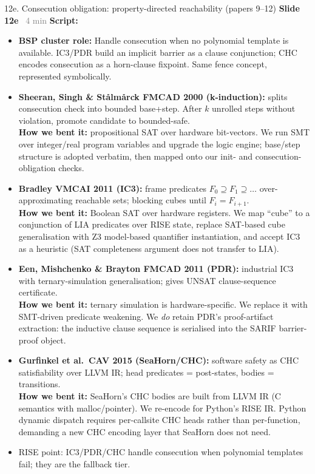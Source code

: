 \documentclass[aspectratio=169]{beamer}
\newcommand{\syncline}[2]{\textbf{#1} \hfill \textcolor{gray}{#2}}
\begin{document}
\begin{frame}[shrink=68]{12e. Consecution obligation: property-directed reachability (papers 9--12)}
\syncline{Slide 12e}{~4 min}
\textbf{Script:}
\begin{itemize}
  \item \textbf{BSP cluster role:} Handle consecution when no polynomial template is available. IC3/PDR build an implicit barrier as a clause conjunction; CHC encodes consecution as a horn-clause fixpoint. Same fence concept, represented symbolically.
  \item \textbf{Sheeran, Singh \& St\aa lm\aa rck FMCAD 2000 (k-induction):} splits consecution check into bounded base+step. After \(k\) unrolled steps without violation, promote candidate to bounded-safe.\\
    \textbf{How we bent it:} propositional SAT over hardware bit-vectors. We run SMT over integer/real program variables and upgrade the logic engine; base/step structure is adopted verbatim, then mapped onto our init- and consecution-obligation checks.
  \item \textbf{Bradley VMCAI 2011 (IC3):} frame predicates \(F_0\supseteq F_1\supseteq\ldots\) over-approximating reachable sets; blocking cubes until \(F_i=F_{i+1}\).\\
    \textbf{How we bent it:} Boolean SAT over hardware registers. We map ``cube'' to a conjunction of LIA predicates over RISE state, replace SAT-based cube generalisation with Z3 model-based quantifier instantiation, and accept IC3 as a heuristic (SAT completeness argument does not transfer to LIA).
  \item \textbf{Een, Mishchenko \& Brayton FMCAD 2011 (PDR):} industrial IC3 with ternary-simulation generalisation; gives UNSAT clause-sequence certificate.\\
    \textbf{How we bent it:} ternary simulation is hardware-specific. We replace it with SMT-driven predicate weakening. We \emph{do} retain PDR's proof-artifact extraction: the inductive clause sequence is serialised into the SARIF barrier-proof object.
  \item \textbf{Gurfinkel et al.\ CAV 2015 (SeaHorn/CHC):} software safety as CHC satisfiability over LLVM IR; head predicates = post-states, bodies = transitions.\\
    \textbf{How we bent it:} SeaHorn's CHC bodies are built from LLVM IR (C semantics with malloc/pointer). We re-encode for Python's RISE IR. Python dynamic dispatch requires per-callsite CHC heads rather than per-function, demanding a new CHC encoding layer that SeaHorn does not need.
  \item RISE point: IC3/PDR/CHC handle consecution when polynomial templates fail; they are the fallback tier.
\end{itemize}
\end{frame}
\end{document}
